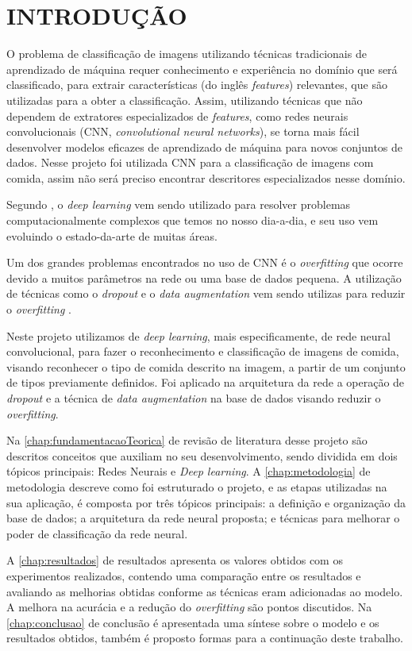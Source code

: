 
\chapter{INTRODUÇÃO}
\label{chap:introducao}
O problema de classificação de imagens utilizando técnicas tradicionais de aprendizado de máquina requer conhecimento e experiência no domínio que será classificado, para extrair características (do inglês \textit{features}) relevantes, que são utilizadas para a obter a classificação. Assim, utilizando técnicas que não dependem de extratores especializados de \textit{features}, como redes neurais convolucionais (CNN, \textit{convolutional neural networks}), se torna mais fácil desenvolver modelos eficazes de aprendizado de máquina para novos conjuntos de dados. Nesse projeto foi utilizada CNN para a classificação de imagens com comida, assim não será preciso encontrar descritores especializados nesse domínio. 
\par Segundo , o \textit{deep learning} vem sendo utilizado para resolver problemas computacionalmente complexos que temos no nosso dia-a-dia, e seu uso vem evoluindo o estado-da-arte de muitas áreas.
\par Um dos grandes problemas encontrados no uso de CNN é o \textit{overfitting} \cite{imaginetArticle} que ocorre devido a muitos parâmetros na rede ou uma base de dados pequena. A utilização de técnicas como o \textit{dropout} e o \textit{data augmentation} vem sendo utilizas para reduzir o \textit{overfitting} \cite{srivastava2014dropout}.

\par Neste projeto utilizamos de \textit{deep learning}, mais especificamente, de rede neural convolucional, para fazer o reconhecimento e classificação de imagens de comida, visando reconhecer o tipo de comida descrito na imagem, a partir de um conjunto de tipos previamente definidos. Foi aplicado na arquitetura da rede a operação de \textit{dropout} e a técnica de \textit{data augmentation} na base de dados visando reduzir o \textit{overfitting}. 
\par Na \autoref{chap:fundamentacaoTeorica} de revisão de literatura desse projeto são descritos conceitos que auxiliam no seu desenvolvimento, sendo dividida em dois tópicos principais: Redes Neurais e \textit{Deep learning}. A \autoref{chap:metodologia} de metodologia descreve como foi estruturado o projeto, e as etapas utilizadas na sua aplicação, é composta por três tópicos principais: a definição e organização da base de dados; a arquitetura da rede neural proposta; e técnicas para melhorar o poder de classificação da rede neural.
\par A \autoref{chap:resultados} de resultados apresenta os valores obtidos com os experimentos realizados, contendo uma comparação entre os resultados e avaliando as melhorias obtidas conforme as técnicas eram adicionadas ao modelo. A melhora na acurácia e a redução do \textit{overfitting} são pontos discutidos. Na \autoref{chap:conclusao} de conclusão é apresentada uma síntese sobre o modelo e os resultados obtidos, também é proposto formas para a continuação deste trabalho.
